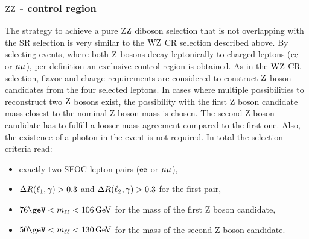 \subsubsection*{$\mathrm{Z}\mathrm{Z}$ - control region}\label{sec:VR}
The strategy to achieve a pure $\mathrm{Z}\mathrm{Z}$ diboson selection that is not overlapping with the SR selection is very similar to the $\mathrm{W}\mathrm{Z}$ CR selection described above. By selecting events, where both $\mathrm{Z}$ bosons decay leptonically to charged leptons ($\mathrm{e}\mathrm{e}$ or $\mu\mu$), per definition an exclusive control region is obtained. As in the $\mathrm{W}\mathrm{Z}$ CR selection, flavor and charge requirements are considered to construct $\mathrm{Z}$ boson candidates from the four selected leptons. In cases where multiple possibilities to reconstruct two $\mathrm{Z}$ bosons exist, the possibility with the first Z boson candidate mass closest to the nominal Z boson mass is chosen. The second Z boson candidate has to fulfill a looser mass agreement compared to the first one. Also, the existence of a photon in the event is not required. In total the selection criteria read:
\begin{itemize}
 \item exactly two SFOC lepton pairs ($\mathrm{e}\mathrm{e}$ or $\mu\mu$),
 \item $\Delta R(\ell_1,\gamma)>0.3$ and $\Delta R(\ell_2,\gamma)>0.3$ for the first pair,
 \item $76\geV<m_{\ell\ell}<106\GeV$ for the mass of the first Z boson candidate,
 \item $50\geV<m_{\ell\ell}<130\GeV$ for the mass of the second Z boson candidate.
\end{itemize}
